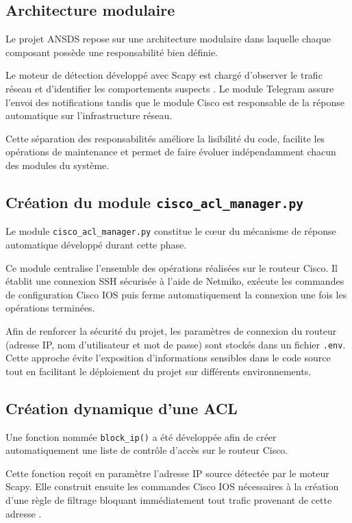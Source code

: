 \subsection{Architecture modulaire}

Le projet ANSDS repose sur une architecture modulaire dans laquelle chaque composant possède une responsabilité bien définie.

Le moteur de détection développé avec Scapy est chargé d'observer le trafic réseau et d'identifier les comportements suspects \cite{scapy_docs}. Le module Telegram assure l'envoi des notifications tandis que le module Cisco est responsable de la réponse automatique sur l'infrastructure réseau.

Cette séparation des responsabilités améliore la lisibilité du code, facilite les opérations de maintenance et permet de faire évoluer indépendamment chacun des modules du système.

\subsection{Création du module \texttt{cisco\_acl\_manager.py}}

Le module \texttt{cisco\_acl\_manager.py} constitue le cœur du mécanisme de réponse automatique développé durant cette phase.

Ce module centralise l'ensemble des opérations réalisées sur le routeur Cisco. Il établit une connexion SSH sécurisée à l'aide de Netmiko, exécute les commandes de configuration Cisco IOS puis ferme automatiquement la connexion une fois les opérations terminées.

Afin de renforcer la sécurité du projet, les paramètres de connexion du routeur (adresse IP, nom d'utilisateur et mot de passe) sont stockés dans un fichier \texttt{.env}. Cette approche évite l'exposition d'informations sensibles dans le code source tout en facilitant le déploiement du projet sur différents environnements.

\subsection{Création dynamique d'une ACL}

Une fonction nommée \texttt{block\_ip()} a été développée afin de créer automatiquement une liste de contrôle d'accès sur le routeur Cisco.

Cette fonction reçoit en paramètre l'adresse IP source détectée par le moteur Scapy. Elle construit ensuite les commandes Cisco IOS nécessaires à la création d'une règle de filtrage bloquant immédiatement tout trafic provenant de cette adresse \cite{cisco_ios}.


